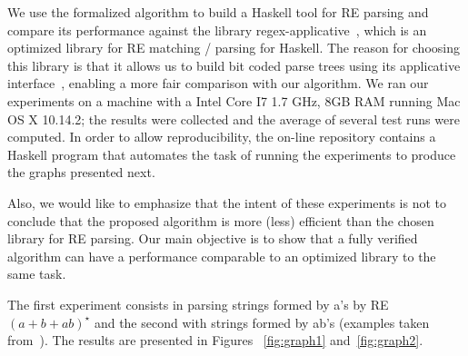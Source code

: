 \documentclass[review]{elsarticle}
\theoremstyle{definition}
\begin{document}
We use the formalized algorithm to build a Haskell tool for RE parsing and
compare its performance against the library
regex-applicative~\cite{regex-applicative}, which is an optimized library for RE
matching / parsing for Haskell. The reason for choosing this library is that it allows us to 
build bit coded parse trees using its applicative interface~\cite{Mcbride2008},
enabling a more fair comparison with our algorithm.
We ran our experiments on a machine with a Intel Core I7 1.7 GHz, 8GB RAM 
running Mac OS X 10.14.2; the results were collected and the average of several 
test runs were computed. In order to allow reproducibility, the on-line
repository contains a Haskell program that automates the task of running the 
experiments to produce the graphs presented next.

Also, we would like to emphasize that the intent of these experiments is not to
conclude that the proposed algorithm is more (less) efficient than the chosen 
library for RE parsing. Our main objective is to show that a fully verified
algorithm can have a performance comparable to an optimized library to the 
same task. 

The first experiment consists in parsing strings formed by a's by RE 
$(a + b + ab)^\star$ and the second with strings formed by ab's 
(examples taken from~\cite{Sulzmann14}). The results are presented in Figures
~\ref{fig:graph1} and~\ref{fig:graph2}.
\end{document}
